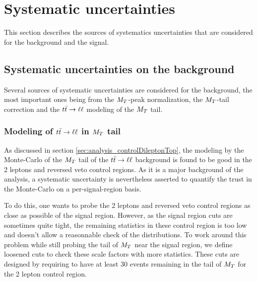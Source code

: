     \section{Systematic uncertainties \label{sec:analysis_systematics}}

        This section describes the sources of systematics uncertainties that are considered for the background and the signal.

        \subsection{Systematic uncertainties on the background \label{sec:background_systematics}}

            Several sources of systematic uncertainties are considered for the background,
            the most important ones being from the $M_T$-peak normalization, the $M_T$-tail
            correction and the $t\bar{t} \rightarrow \ell \ell$ modeling of the $M_T$ tail.

            \subsubsection{Modeling of $t\bar{t} \rightarrow \ell \ell$ in $M_T$ tail}

            As discussed in section \ref{sec:analysis_controlDileptonTop}, the modeling by
            the Monte-Carlo of the $M_T$ tail of the $t\bar{t} \rightarrow \ell \ell$ background is found
            to be good in the 2 leptons and reversed veto control regions. As it is a
            major background of the analysis, a systematic uncertainty is nevertheless
            asserted to quantify the trust in the Monte-Carlo on a per-signal-region basis.

            To do this, one wants to probe the 2 leptons and reversed veto control regions
            as close as possible of the signal region. However, as the signal region cuts
            are sometimes quite tight, the remaining statistics in these control region is
            too low and doesn't allow a reasonnable check of the distributions. To work
            around this problem while still probing the tail of $M_T$ near the signal
            region, we define loosened cuts to check these scale factors with more
            statistics. These cuts are designed by requiring to have at least 30 events
            remaining in the tail of $M_T$ for the 2 lepton control region.

